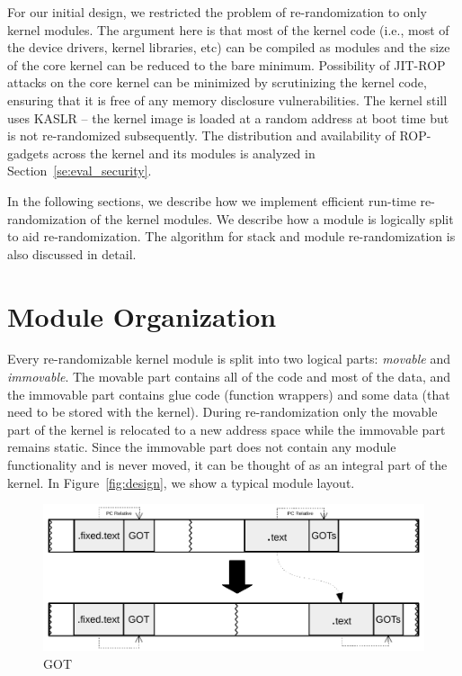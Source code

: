 For our initial design, we restricted the problem of re-randomization to only kernel modules. The argument here is that most of the kernel code (i.e., most of the device drivers, kernel libraries, etc) can be compiled as modules and the size of the core kernel can be reduced to the bare minimum. Possibility of JIT-ROP attacks on the core kernel can be minimized by scrutinizing the kernel code, ensuring that it is free of any memory disclosure vulnerabilities.
The kernel still uses KASLR -- the kernel image is loaded at a random address at boot time but is not re-randomized subsequently. The distribution and availability of ROP-gadgets across the kernel and its modules is analyzed in Section~\ref{se:eval_security}.

In the following sections, we describe how we implement efficient run-time re-randomization of the kernel modules. We describe how a module is logically split to aid re-randomization. The algorithm for stack and module re-randomization is also discussed in detail.

\section{Module Organization}\label{se:module_organization}
Every re-randomizable kernel module is split into two logical parts: \textit{movable} and \textit{immovable}. The movable part contains all of the code and most of the data, and the immovable part contains glue code (function wrappers) and some data (that need to be stored with the kernel). During re-randomization only the movable part of the kernel is relocated to a new address space while the immovable part remains static. Since the immovable part does not contain any module functionality and is never moved, it can be thought of as an integral part of the kernel. In Figure~\ref{fig:design}, we show a typical module layout.

\begin{figure}[ht!]
\centering
\includegraphics[width=.8\columnwidth]{pictures/rand_got.pdf}
\caption{GOT}
\label{fig:gots}
\end{figure}

